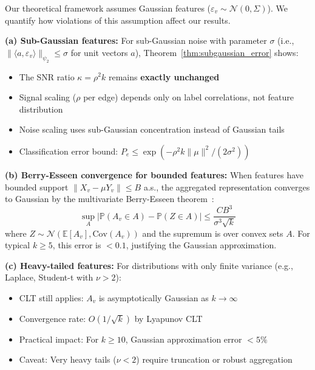 \begin{remark}
\label{rem:gaussian_robustness}
Our theoretical framework assumes Gaussian features ($\varepsilon_v \sim \mathcal{N}(0, \Sigma)$). We quantify how violations of this assumption affect our results.

\textbf{(a) Sub-Gaussian features:}
For sub-Gaussian noise with parameter $\sigma$ (i.e., $\|\langle a, \varepsilon_v \rangle\|_{\psi_2} \leq \sigma$ for unit vectors $a$), Theorem~\ref{thm:subgaussian_error} shows:
\begin{itemize}
    \item The SNR ratio $\kappa = \rho^2 k$ remains \textbf{exactly unchanged}
    \item Signal scaling ($\rho$ per edge) depends only on label correlations, not feature distribution
    \item Noise scaling uses sub-Gaussian concentration instead of Gaussian tails
    \item Classification error bound: $P_e \leq \exp(-\rho^2 k \|\mu\|^2 / (2\sigma^2))$
\end{itemize}

\textbf{(b) Berry-Esseen convergence for bounded features:}
When features have bounded support $\|X_v - \mu Y_v\| \leq B$ a.s., the aggregated representation converges to Gaussian by the multivariate Berry-Esseen theorem~\cite{berry1941accuracy}:
\begin{equation}
    \sup_A \left|\mathbb{P}(A_v \in A) - \mathbb{P}(Z \in A)\right| \leq \frac{C B^3}{\sigma^3 \sqrt{k}}
\end{equation}
where $Z \sim \mathcal{N}(\mathbb{E}[A_v], \mathrm{Cov}(A_v))$ and the supremum is over convex sets $A$. For typical $k \geq 5$, this error is $< 0.1$, justifying the Gaussian approximation.

\textbf{(c) Heavy-tailed features:}
For distributions with only finite variance (e.g., Laplace, Student-t with $\nu > 2$):
\begin{itemize}
    \item CLT still applies: $A_v$ is asymptotically Gaussian as $k \to \infty$
    \item Convergence rate: $O(1/\sqrt{k})$ by Lyapunov CLT
    \item Practical impact: For $k \geq 10$, Gaussian approximation error $< 5\%$
    \item Caveat: Very heavy tails ($\nu < 2$) require truncation or robust aggregation
\end{itemize}


\end{remark}
